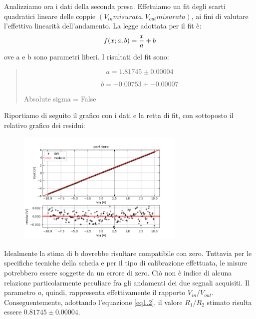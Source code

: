 Analizziamo ora i dati della seconda presa. Effetuiamo un fit degli scarti quadratici lineare delle coppie $(V_{in} misurata, V_{out} misurata)$, ai fini di valutare l'effettiva linearità dell'andamento. 
La legge adottata per il fit è:
\begin{equation}
    f(x; a, b) = {x \over{a}} + b
\end{equation}
ove a e b sono parametri liberi.
I risultati del fit sono:
\begin{center}
\begin{verse}
\begin{equation}
    a = 1.81745 \pm 0.00004
\end{equation}\par
\begin{equation}
    b = -0.00753 +- 0.00007
\end{equation}\par
\begin{center}
Absolute sigma = False\par
\end{center}
\end{verse}
\end{center}
Riportiamo di seguito il grafico con i dati e la retta di fit, con sottoposto il relativo grafico dei residui:
\begin{figure}[H]
\caption{}
    \includegraphics[width=8cm]{settimana_1/immagini/fit_1.png}
    \centering
\end{figure}

Idealmente la stima di b dovrebbe risultare compatibile con zero. Tuttavia per le specifiche tecniche della scheda e per il tipo di calibrazione effettuata, le misure potrebbero essere soggette da un errore di zero. Ciò non è indice di alcuna relazione particolarmente peculiare fra gli andamenti dei due segnali acquisiti.
Il parametro $a$, quindi, rappresenta effettivamente il rapporto $V_{in}/V_{out}$. Conseguentemente, adottando l'equazione \eqref{eq1.2},
il valore $R_{1}/R_{2}$ stimato risulta essere $0.81745 \pm 0.00004$.

